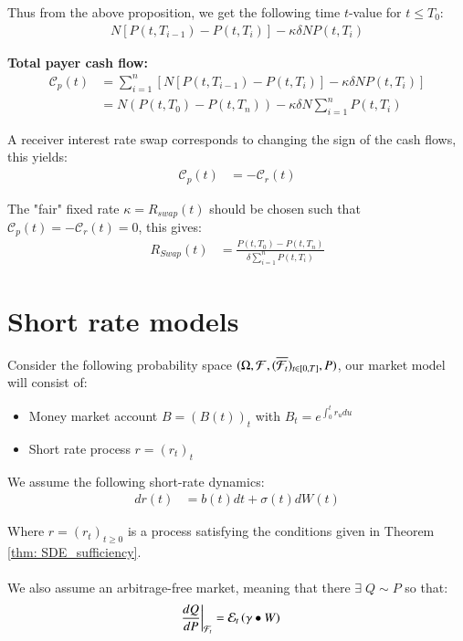 Thus from the above proposition, we get the following time $t$-value for $t\leq T_{0}$:
\begin{align*}
N[P(t,T_{i-1}) - P(t,T_{i})] - \kappa\delta N P(t,T_{i})   
\end{align*}

\textbf{Total payer cash flow:}
\begin{align*}
\mathcal{C}_{p}(t) &= \sum_{i=1}^{n}\left[
 N[P(t,T_{i-1}) - P(t,T_{i})] - \kappa\delta N P(t,T_{i}) 
\right]  \\
&= N(P(t,T_{0})-P(t,T_{n})) - \kappa\delta N\sum_{i=1}^{n}P(t,T_{i})
\end{align*} 

A receiver interest rate swap corresponds to changing the sign of the cash flows, this yields:
\begin{align*}
\mathcal{C}_{p}(t) &= -\mathcal{C}_{r}(t)    
\end{align*}

\begin{result}
The "fair" fixed rate $\kappa = R_{swap}(t)$ should be chosen such that $\mathcal{C}_{p}(t) = -\mathcal{C}_{r}(t) = 0$, this gives:
\begin{align*}
R_{Swap}(t) &= \frac{P(t,T_{0}) - P(t,T_{n})}{\delta \sum_{i=1}^{n}P(t,T_{i})}
\end{align*} 
\end{result}

\newpage

\section{Short rate models}
Consider the following probability space $(\Omega, \mathcal{F}, (\overline{\mathcal{F}_{t}})_{t \in [0,T]}, P)$, our market model will consist of:
\begin{itemize}
    \item Money market account $B = (B(t))_{t}$ with $B_{t} = e^{\int_{0}^{t}r_{u}du}$
    \item Short rate process $r = (r_{t})_{t}$
\end{itemize}

We assume the following short-rate dynamics:
\begin{align*}
dr(t) &= b(t)dt + \sigma(t)dW(t)   
\end{align*} 

Where $r = (r_{t})_{t\geq 0}$ is a process satisfying the conditions given in Theorem \ref{thm: SDE_sufficiency}. 
\\~\\
We also assume an arbitrage-free market, meaning that there $\exists \; Q\sim P$ so that: 
\begin{align*}
\frac{dQ}{dP}\bigg{|}_{\mathcal{F}_{t}} &= \mathcal{E}_{t}\left(
\gamma \bullet W
\right)    
\end{align*}

